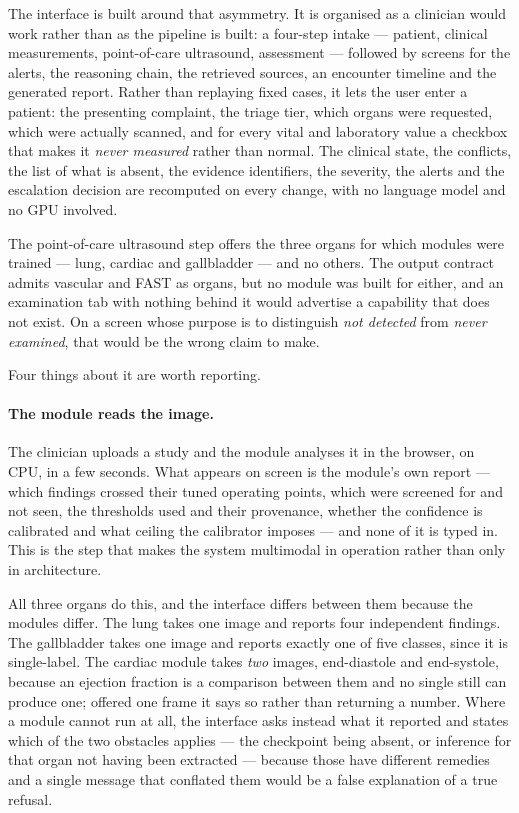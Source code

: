 The interface is built around that asymmetry. It is organised as a clinician would work rather
than as the pipeline is built: a four-step intake --- patient, clinical measurements,
point-of-care ultrasound, assessment --- followed by screens for the alerts, the reasoning
chain, the retrieved sources, an encounter timeline and the generated report. Rather than
replaying fixed cases, it lets the user enter a patient: the presenting complaint, the triage
tier, which organs were requested, which were actually scanned, and for every vital and
laboratory value a checkbox that makes it \emph{never measured} rather than normal. The
clinical state, the conflicts, the list of what is absent, the evidence identifiers, the
severity, the alerts and the escalation decision are recomputed on every change, with no
language model and no GPU involved.

The point-of-care ultrasound step offers the three organs for which modules were trained ---
lung, cardiac and gallbladder --- and no others. The output contract admits vascular and FAST
as organs, but no module was built for either, and an examination tab with nothing behind it
would advertise a capability that does not exist. On a screen whose purpose is to distinguish
\emph{not detected} from \emph{never examined}, that would be the wrong claim to make.

Four things about it are worth reporting.

\paragraph{The module reads the image.} The clinician uploads a study and the module analyses it
in the browser, on CPU, in a few seconds. What appears on screen is the module's own report ---
which findings crossed their tuned operating points, which were screened for and not seen, the
thresholds used and their provenance, whether the confidence is calibrated and what ceiling the
calibrator imposes --- and none of it is typed in. This is the step that makes the system
multimodal in operation rather than only in architecture.

All three organs do this, and the interface differs between them because the modules differ. The
lung takes one image and reports four independent findings. The gallbladder takes one image and
reports exactly one of five classes, since it is single-label. The cardiac module takes
\emph{two} images, end-diastole and end-systole, because an ejection fraction is a comparison
between them and no single still can produce one; offered one frame it says so rather than
returning a number. Where a module cannot run at all, the interface asks instead what it
reported and states which of the two obstacles applies --- the checkpoint being absent, or
inference for that organ not having been extracted --- because those have different remedies and
a single message that conflated them would be a false explanation of a true refusal.

